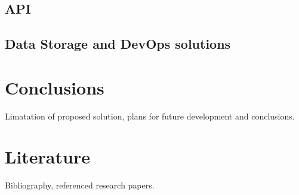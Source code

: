 \documentclass{article}
\begin{document}
	\subsection{API}
	\subsection{Data Storage and DevOps solutions}
	
	\section{Conclusions}
	Limatation of proposed solution, plans for future development and conclusions.
	
	\section{Literature}
	Bibliography, referenced research papers.
	
\end{document}
